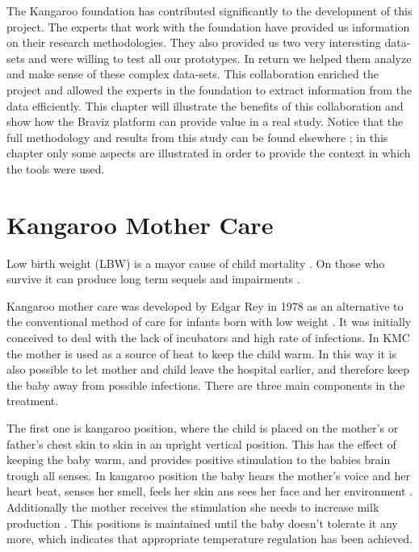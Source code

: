 \label{chap_kmc400}



The Kangaroo foundation has contributed significantly to the development of this project. The experts that work with the foundation have provided us information on their research methodologies. They also provided us two very interesting data-sets and were willing to test all our prototypes. In return we helped them analyze and make sense of these complex data-sets. This collaboration enriched the project and allowed the experts in the foundation to extract information from the data efficiently. This chapter will illustrate the benefits of this collaboration and show how the Braviz platform can provide value in a real study. Notice that the full methodology and results from this study can be found elsewhere \autocite{charpak_final_2015}; in this chapter only some aspects are illustrated in order to provide the context in which the tools were used.

\section{Kangaroo Mother Care}

Low birth weight (LBW) is a mayor cause of child mortality \autocite{wardlaw_low_2005}. On those who survive it can produce long term sequels and impairments \autocite{nosarti_neurodevelopmental_2010}. 

Kangaroo mother care was developed by Edgar Rey in 1978 \autocite{rey_rational_1983} as an alternative to the conventional method of care for infants born with low weight \autocite{conde-agudelo_kangaroo_2003}. It was initially conceived to deal with the lack of incubators and high rate of infections. In KMC the mother is used as a source of heat to keep the child warm. In this way it is also possible to let mother and child leave the hospital earlier, and therefore keep the baby away from possible infections. There are three main components in the treatment.

The first one is kangaroo position, where the child is placed on the mother's or father's chest skin to skin in an upright vertical position. This has the effect  of keeping the baby warm, and provides positive stimulation to the babies brain trough all senses. In kangaroo position the baby hears the mother's voice and her heart beat, senses her smell, feels her skin ans sees her face and her environment \autocite{tessier_kangaroo_2003}. Additionally the mother receives the stimulation she needs to increase milk production \autocite{charpak_kangaroo_2005}. This positions is maintained until the baby doesn't tolerate it any more, which indicates that appropriate temperature regulation has been achieved. 

